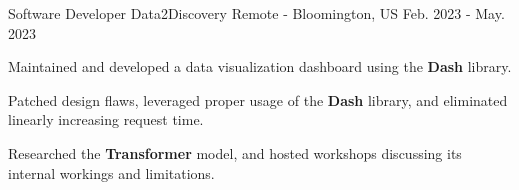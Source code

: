 \begin{cventries}
  \cventry
    {Software Developer} %
    {Data2Discovery} %
    {Remote - Bloomington, US} %
    {Feb. 2023 - May. 2023} %
    {
      \begin{cvitems} %
        \item {Maintained and developed a data visualization dashboard using the \textbf{Dash} library.}
        \item {Patched design flaws, leveraged proper usage of the \textbf{Dash} library, and eliminated linearly increasing request time.}
        \item {Researched the \textbf{Transformer} model, and hosted workshops discussing its internal workings and limitations.}
      \end{cvitems}
    }

\end{cventries}
